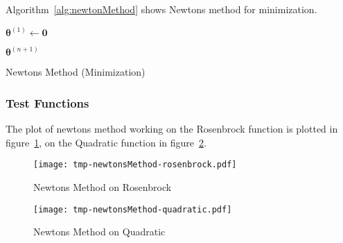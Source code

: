 \documentclass[a4paper, 11pt, accentcolor = tud3b]{tudreport}
\renewcommand{\vec}[1]{\mathbf{#1}}
\begin{document}
				Algorithm~\ref{alg:newtonMethod} shows Newtons method for minimization.

				\begin{algorithm}
					\(\vec{\theta}^{(1)} \gets \vec{0}\)

					\For{\( i = 1, \cdots, n \)}{
						\( \vec{\theta}^{(i + 1)} \gets \vec{\theta}^{(i)} - \alpha H^{-1}\big(\vec{\theta}^{(i)}\big) \vec{g}\big(\vec{\theta}^{(i)}\big) \)
					}

					\Return \(\vec{\theta}^{(n + 1)}\)

					\caption{Newtons Method (Minimization)}
					\label{alg:newtonMethod}
				\end{algorithm}

				\subsubsection{Test Functions}
					The plot of newtons method working on the Rosenbrock function is plotted in figure~\ref{fig:newtonsMethodExampleRosenbrock}, on the Quadratic function in figure~\ref{fig:newtonsMethodExampleQuadratic}.

					\begin{figure}
						\centering
						\texttt{[image: tmp-newtonsMethod-rosenbrock.pdf]}
						\caption{Newtons Method on Rosenbrock}
						\label{fig:newtonsMethodExampleRosenbrock}
					\end{figure}
					\begin{figure}
						\centering
						\texttt{[image: tmp-newtonsMethod-quadratic.pdf]}
						\caption{Newtons Method on Quadratic}
						\label{fig:newtonsMethodExampleQuadratic}
					\end{figure}
\end{document}
